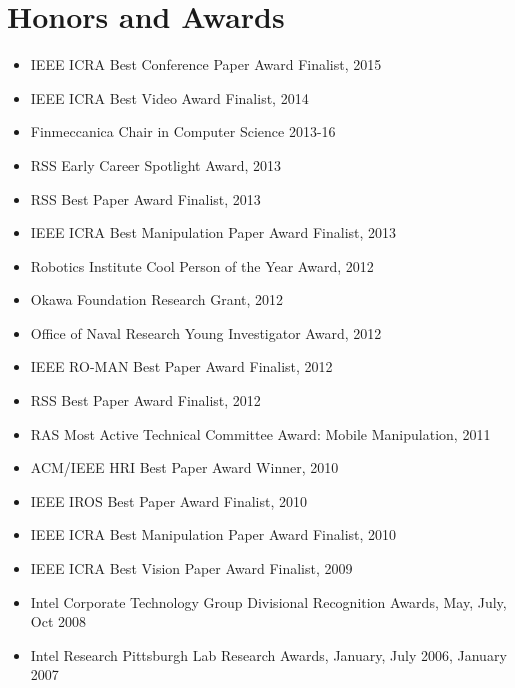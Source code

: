 

\section{Honors and Awards}
\begin{itemize}
\addtolength{\itemsep}{-0.5\baselineskip}
\item IEEE ICRA Best Conference Paper Award Finalist, 2015
\item IEEE ICRA Best Video Award Finalist, 2014
\item Finmeccanica Chair in Computer Science 2013-16
\item RSS Early Career Spotlight Award, 2013
\item RSS Best Paper Award Finalist, 2013
\item IEEE ICRA Best Manipulation Paper Award Finalist, 2013
\item Robotics Institute Cool Person of the Year Award, 2012
\item Okawa Foundation Research Grant, 2012
\item Office of Naval Research Young Investigator Award, 2012
\item IEEE RO-MAN Best Paper Award Finalist, 2012
\item RSS Best Paper Award Finalist, 2012
\item RAS Most Active Technical Committee Award: Mobile Manipulation, 2011 
\item ACM/IEEE HRI Best Paper Award Winner, 2010
\item IEEE IROS Best Paper Award Finalist, 2010
\item IEEE ICRA Best Manipulation Paper Award Finalist, 2010
\item IEEE ICRA Best Vision Paper Award Finalist, 2009
\item Intel Corporate Technology Group Divisional Recognition Awards, May, July, Oct 2008
\item Intel Research Pittsburgh Lab Research Awards, January, July 2006, January 2007
\end{itemize}
